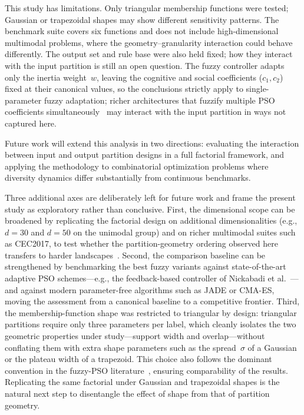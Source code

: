 \documentclass[conference]{IEEEtran}
\newcommand{\new}[1]{{\color{red}#1}}
\begin{document}
This study has limitations. Only triangular membership functions were tested; Gaussian or trapezoidal shapes may show different sensitivity patterns. The benchmark suite covers six functions and does not include high-dimensional multimodal problems, where the geometry--granularity interaction could behave differently. The output set and rule base were also held fixed; how they interact with the input partition is still an open question. %
\new{The fuzzy controller adapts only the inertia weight~$w$, leaving the cognitive and social coefficients ($c_1, c_2$) fixed at their canonical values, so the conclusions strictly apply to single-parameter fuzzy adaptation; richer architectures that fuzzify multiple PSO coefficients simultaneously~\cite{nobile2018fuzzy, xia2022particle, roy2024hyperparameter} may interact with the input partition in ways not captured here.}

Future work will extend this analysis in two directions: evaluating the interaction between input and output partition designs in a full factorial framework, and applying the methodology to combinatorial optimization problems where diversity dynamics differ substantially from continuous benchmarks.

\new{Three additional axes are deliberately left for future work and frame the present study as exploratory rather than conclusive. First, the dimensional scope can be broadened by replicating the factorial design on additional dimensionalities (e.g., $d{=}30$ and $d{=}50$ on the unimodal group) and on richer multimodal suites such as CEC2017, to test whether the partition-geometry ordering observed here transfers to harder landscapes~\cite{nobile2018fuzzy, xia2022particle}. Second, the comparison baseline can be strengthened by benchmarking the best fuzzy variants against state-of-the-art adaptive PSO schemes---e.g., the feedback-based controller of Nickabadi et al.~\cite{nickabadi2011novel}---and against modern parameter-free algorithms such as JADE or CMA-ES, moving the assessment from a canonical baseline to a competitive frontier. Third, the membership-function shape was restricted to triangular by design: triangular partitions require only three parameters per label, which cleanly isolates the two geometric properties under study---support width and overlap---without conflating them with extra shape parameters such as the spread~$\sigma$ of a Gaussian or the plateau width of a trapezoid. This choice also follows the dominant convention in the fuzzy-PSO literature~\cite{shi2001fuzzy, olivas2014comparative, valdez2017comparative, nobile2018fuzzy}, ensuring comparability of the results. Replicating the same factorial under Gaussian and trapezoidal shapes is the natural next step to disentangle the effect of shape from that of partition geometry.}
\end{document}
